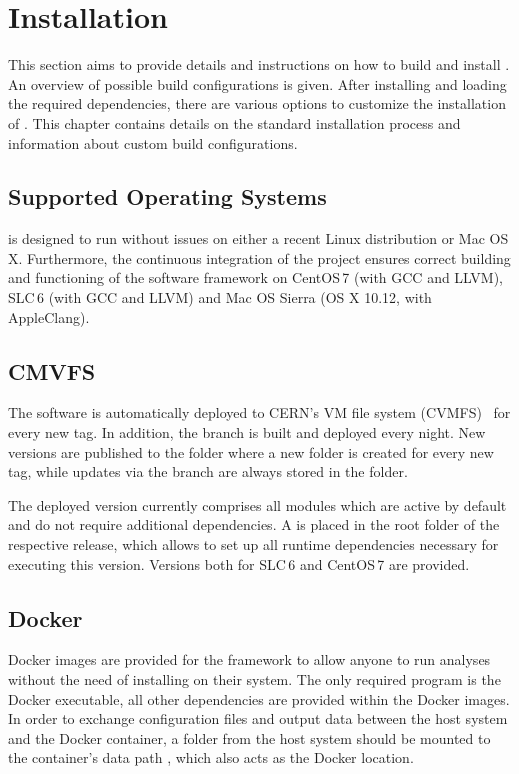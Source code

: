 \chapter{Installation}
\label{ch:installation}

This section aims to provide details and instructions on how to build and install \corry.
An overview of possible build configurations is given.
After installing and loading the required dependencies, there are various options to customize the installation of \corry.
This chapter contains details on the standard installation process and information about custom build configurations.

\section{Supported Operating Systems}
\label{sec:os}
\corry is designed to run without issues on either a recent Linux distribution or Mac OS\,X.
Furthermore, the continuous integration of the project ensures correct building and functioning of the software framework on CentOS\,7 (with GCC and LLVM), SLC\,6 (with GCC and LLVM) and Mac OS Sierra (OS X 10.12, with AppleClang).

\section{CMVFS}
\label{sec:cvmfs}
The software is automatically deployed to CERN's VM file system (CVMFS)~\cite{cvmfs} for every new tag.
In addition, the  branch is built and deployed every night.
New versions are published to the folder  where a new folder is created for every new tag, while updates via the  branch are always stored in the  folder.

The deployed version currently comprises all modules which are active by default and do not require additional dependencies.
A  is placed in the root folder of the respective release, which allows to set up all runtime dependencies necessary for executing this version.
Versions both for SLC\,6 and CentOS\,7 are provided.

\section{Docker}
\label{sec:docker}
Docker images are provided for the framework to allow anyone to run analyses without the need of installing \corry on their system.
The only required program is the Docker executable, all other dependencies are provided within the Docker images.
In order to exchange configuration files and output data between the host system and the Docker container, a folder from the host system should be mounted to the container's data path , which also acts as the Docker  location.

